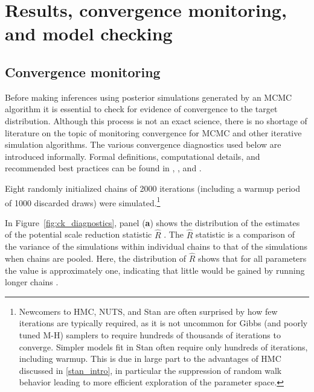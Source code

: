 \section{Results, convergence monitoring, and model checking}
\label{results_convergence_checking}


\subsection{Convergence monitoring}
\label{subsection_convergence}

Before making inferences using posterior simulations generated by an MCMC algorithm 
it is essential to check for evidence of convergence to the target distribution. Although this 
process is not an exact science, there is no shortage of literature on the topic of monitoring 
convergence for MCMC and other iterative simulation algorithms. The various convergence 
diagnostics used below are introduced informally. Formal definitions, computational details, 
and recommended best practices can be found in , 
, and .

Eight randomly initialized chains of 2000 iterations (including a warmup period of 1000 
discarded draws) were simulated.\footnote{Newcomers to HMC, NUTS, and Stan are 
often surprised by how few iterations are typically required, as it is not uncommon for 
Gibbs (and poorly tuned M-H) samplers to require hundreds of thousands of iterations 
to converge. Simpler models fit in Stan often require only hundreds of iterations, including 
warmup. This is due in large part to the advantages of HMC discussed in \ref{stan_intro}, in
particular the suppression of random walk behavior leading to more efficient exploration
of the parameter space.} 

In Figure~\ref{fig:ck_diagnostics}, panel ({\bf a}) shows the distribution of the estimates of 
the potential scale reduction statistic $\hat{R}$  . The $\hat{R}$ 
statistic is a comparison of the variance of the simulations within individual chains to that of 
the simulations when chains are pooled. Here, the distribution of $\hat{R}$ shows that for 
all parameters the value is approximately one, indicating that little would be gained by running 
longer chains . 

